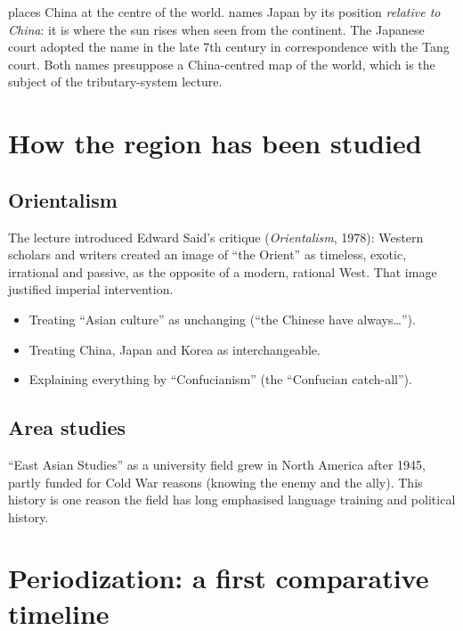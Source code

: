 \begin{example}
 places China at the centre of the world.  names Japan by its position
\emph{relative to China}: it is where the sun rises when seen from the continent. The
Japanese court adopted the name in the late 7th century in correspondence with the Tang
court. Both names presuppose a China-centred map of the world, which is the subject of the
tributary-system lecture.
\end{example}

\section{How the region has been studied}

\subsection{Orientalism}

The lecture introduced Edward Said's critique (\emph{Orientalism}, 1978): Western scholars
and writers created an image of ``the Orient'' as timeless, exotic, irrational and
passive, as the opposite of a modern, rational West. That image justified imperial
intervention.

\begin{important}
\begin{itemize}
  \item Treating ``Asian culture'' as unchanging (``the Chinese have always\ldots'').
  \item Treating China, Japan and Korea as interchangeable.
  \item Explaining everything by ``Confucianism'' (the ``Confucian catch-all'').
\end{itemize}
\end{important}

\subsection{Area studies}

``East Asian Studies'' as a university field grew in North America after 1945, partly
funded for Cold War reasons (knowing the enemy and the ally). This history is one reason
the field has long emphasised language training and political history.

\section{Periodization: a first comparative timeline}

